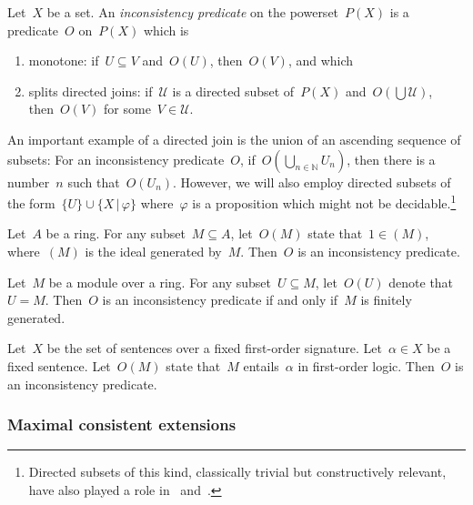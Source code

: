 \documentclass[envcountsect,envcountsame,runningheads]{llncs}
\newcommand{\NN}{\mathbb{N}}
\renewcommand{\_}{\mathpunct{.}\,}
\begin{document}
\begin{definition}Let~$X$ be a set. An \emph{inconsistency predicate} on the
powerset~$P(X)$ is a predicate~$O$ on~$P(X)$ which is
\begin{enumerate}
\item monotone: if~$U \subseteq V$ and~$O(U)$, then~$O(V)$, and which
\item splits directed joins: if~$\mathcal{U}$ is a directed subset of~$P(X)$
and~$O(\bigcup \mathcal{U})$, then~$O(V)$ for some~$V \in \mathcal{U}$.
\end{enumerate}
\end{definition}

An important example of a directed join is the union of an ascending sequence
of subsets: For an inconsistency predicate~$O$, if~$O(\bigcup_{n \in \NN}
U_n)$, then there is a number~$n$ such that~$O(U_n)$. However, we will also
employ directed subsets of the form~$\{ U \} \cup \{ X \,|\, \varphi \}$
where~$\varphi$ is a proposition which might not be
decidable.\footnote{Directed subsets of this kind, classically trivial but
constructively relevant, have also played a role
in~\cite[Lemma~1]{schuster-wessel:jacincpred}
and~\cite[Example~I.1.7(2)]{moerdijk-vermeulen:proper-maps}.}

\begin{example}\label{ex:inc-ring}Let~$A$ be a ring. For any subset~$M \subseteq A$, let~$O(M)$
state that~$1 \in (M)$, where~$(M)$ is the ideal generated by~$M$. Then~$O$ is an
inconsistency predicate.\end{example}

\begin{example}\label{ex:inc-module}Let~$M$ be a module over a ring. For any subset~$U \subseteq M$,
let~$O(U)$ denote that~$U = M$. Then~$O$ is an inconsistency predicate if and
only if~$M$ is finitely generated.\end{example}

\begin{example}\label{ex:inc-formulas}Let~$X$ be the set of sentences over a fixed first-order
signature. Let~$\alpha \in X$ be a fixed sentence. Let~$O(M)$ state that~$M$
entails~$\alpha$ in first-order logic. Then~$O$ is an inconsistency
predicate.\end{example}


\subsubsection{Maximal consistent extensions}
\end{document}
